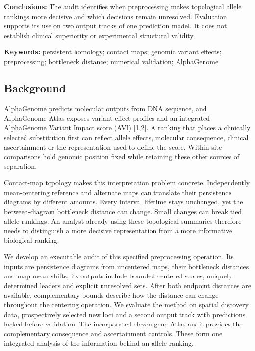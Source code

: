 \documentclass[
  11pt,
]{article}
\begin{document}
\textbf{Conclusions:} The audit identifies when preprocessing makes
topological allele rankings more decisive and which decisions remain
unresolved. Evaluation supports its use on two output tracks of one
prediction model. It does not establish clinical superiority or
experimental structural validity.

\textbf{Keywords:} persistent homology; contact maps; genomic variant
effects; preprocessing; bottleneck distance; numerical validation;
AlphaGenome

\subsection{Background}\label{background}

AlphaGenome predicts molecular outputs from DNA sequence, and
AlphaGenome Atlas exposes variant-effect profiles and an integrated
AlphaGenome Variant Impact score (AVI) {[}1,2{]}. A ranking that places
a clinically selected substitution first can reflect allele effects,
molecular consequence, clinical ascertainment or the representation used
to define the score. Within-site comparisons hold genomic position fixed
while retaining these other sources of separation.

Contact-map topology makes this interpretation problem concrete.
Independently mean-centering reference and alternate maps can translate
their persistence diagrams by different amounts. Every interval lifetime
stays unchanged, yet the between-diagram bottleneck distance can change.
Small changes can break tied allele rankings. An analyst already using
these topological summaries therefore needs to distinguish a more
decisive representation from a more informative biological ranking.

We develop an executable audit of this specified preprocessing
operation. Its inputs are persistence diagrams from uncentered maps,
their bottleneck distances and map mean shifts; its outputs include
bounded centered scores, uniquely determined leaders and explicit
unresolved sets. After both endpoint distances are available,
complementary bounds describe how the distance can change throughout the
centering operation. We evaluate the method on spatial discovery data,
prospectively selected new loci and a second output track with
predictions locked before validation. The incorporated eleven-gene Atlas
audit provides the complementary consequence and ascertainment controls.
These form one integrated analysis of the information behind an allele
ranking.
\end{document}
